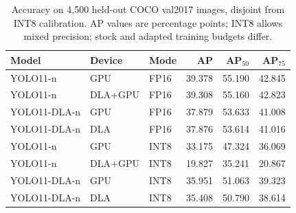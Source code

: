 \begin{table}[t]
\caption{Accuracy on 4,500 held-out COCO val2017 images, disjoint from INT8 calibration. AP values are percentage points; INT8 allows mixed precision; stock and adapted training budgets differ.}
\label{tab:accuracy}\centering\footnotesize
\setlength{\tabcolsep}{3pt}
\begin{tabular*}{\columnwidth}{@{\extracolsep{\fill}}lllrrr@{}}
\toprule
Model & Device & Mode & AP & AP$_{50}$ & AP$_{75}$ \\
\midrule
YOLO11-n & GPU & FP16 & 39.378 & 55.190 & 42.845 \\
YOLO11-n & DLA+GPU & FP16 & 39.308 & 55.160 & 42.823 \\
YOLO11-DLA-n & GPU & FP16 & 37.879 & 53.633 & 41.008 \\
YOLO11-DLA-n & DLA & FP16 & 37.876 & 53.614 & 41.016 \\
\midrule
YOLO11-n & GPU & INT8 & 33.175 & 47.324 & 36.069 \\
YOLO11-n & DLA+GPU & INT8 & 19.827 & 35.241 & 20.867 \\
YOLO11-DLA-n & GPU & INT8 & 35.951 & 51.063 & 39.323 \\
YOLO11-DLA-n & DLA & INT8 & 35.408 & 50.790 & 38.614 \\
\bottomrule
\end{tabular*}
\end{table}

